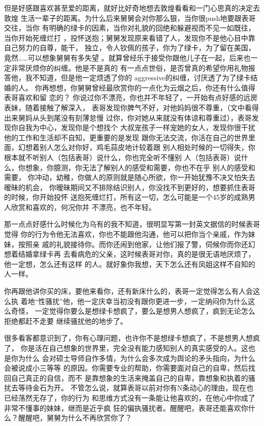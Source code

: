 \documentclass[12pt]{book}
\begin{document}
但是好感跟喜欢甚至爱的距离，就好比好奇地想去敦煌看看和一门心思真的决定去敦煌
生活一辈子的距离。为什么后来舅舅会对你那么狠，当你很push地要跟表哥交往，当你
有明确的绿卡的因素，当你对礼貌的回绝和躲避视而不见一如既往，当你开始死缠烂打
，投怀送抱；舅舅发现原来看错了人，发现你不是他心目中靠自己努力的自尊，能干，
独立，令人钦佩的孩子，你为了绿卡，为了留在美国，竟然……可以想象舅舅有多失望
。就算曾经乐于接受你跟他儿子在一起，后来也一定非常厌烦你的纠缠。他是不是真的
有一点点世俗，是否曾真的希望你用礼物报答他，我不知道，但是他一定烦透了你的
aggressive的纠缠，讨厌透了为了绿卡结婚的人。
你再想想，你舅舅曾经最欣赏你的一点化为云烟之后，你还有什么值得表哥喜欢和留
恋的？
你说过你不漂亮，你也并不年轻了，一开始有点好感的远房表妹，随着接触了解深入，
表哥发现你脾气不好，对他妈妈很不尊重，（文中看得出来舅妈从头到尾没有刻薄怠慢
过你，你对她从来就没有体谅和尊重过），表哥发现你自我为中心，发现你是个想找个
大叔宠孩子一样宠她的女人，发现你很干扰他的工作和生活却不自知，更重要的是发现
跟你无法交流，你活在自己的世界里面，幻想着别人怎么对你好，鸡毛蒜皮地计较着跟
别人相处时候的一切得失，你根本就不听别人（包括表哥）说什么，你也完全听不懂别
人（包括表哥）说什么，你想象，你臆测，你无法了解别人的感受和需要，你也不在乎
别人的感受和需要，
你冲动，幼稚，你做人的原则就是随心所欲，你一开始犹豫不决又怕失去暧昧的机会，
你暧昧期间又不排除结识别人，你没找不到更好的，想要抓住表哥的时候，你开始投怀
送抱死缠烂打，所有这一切，怎么可能是一个45岁的成熟男人欣赏和喜欢的，何况你并
不漂亮，也不年轻。

那一点点好感什么时候化为乌有的我不知道，很明显写第一封英文据信的时候表哥觉得
你的行为令他无法喜欢，你也不能跟他沟通，他可以把你当个亲戚，作为妹妹，按照亲
戚的礼貌接待你。而你还闹到他家，让他们报了警，伺候你而你还幻想着结婚拿绿卡再
去看病危的父亲，这时候表哥对你，真的是很无语地厌烦了，他一定想，怎么还有这样
的人。就好象你我想，天下怎么还有凤姐这样不自知的人一样。

你再跟他讲你买的床，要他来看你，还有新床什么的，表哥一定觉得怎么有人会这么执
着地“性骚扰”他，他一定庆幸当初没有跟你更进一步，一定纳闷你为什么这么奇怪，
一定觉得你要么是想绿卡想疯了，要么是想男人想疯了，疯到无论怎么拒绝都赶不走要
继续骚扰他的地步了。

很多看客都意识到了，你有心理问题，也许你不是想绿卡想疯了，不是想男人想疯了，
你是活在自己想象的世界里，完全没有能力感知别人的真实感受的人。这也是你为什么
会对硕士导师自作多情，为什么会多次成为舆论的矛头指向，为什么会被说成小三等等
的原因。你需要专业的帮助，你需要面对自己的自卑，然后找回自己真正的自信，而不
是靠想象的生活来掩盖自己的自卑，靠想象和执着的骚扰去等待金石为开。
不管怎么说，就算表哥以前对你有N条动心的理由，现在也已经荡然无存了，你的行为
和思维方式没有一条能让他喜欢的，在他心中你成了非常不懂事的妹妹，继而是近乎疯
狂的偏执骚扰者。醒醒吧，表哥还能喜欢你什么？醒醒吧，舅舅为什么不再欣赏你了？
\end{document}
